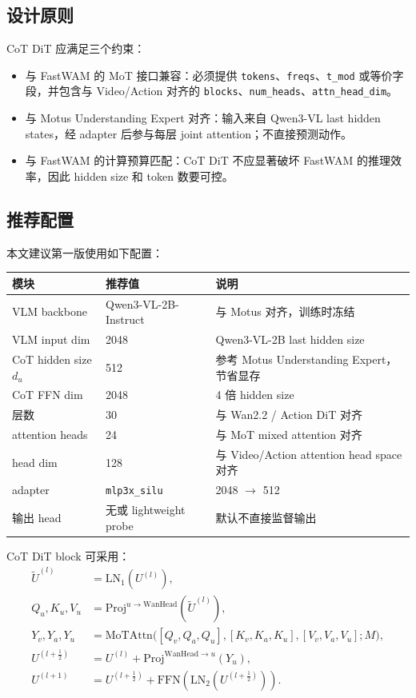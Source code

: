 \documentclass[UTF8,a4paper,11pt]{ctexart}
\begin{document}
\subsection{设计原则}

CoT DiT 应满足三个约束：
\begin{itemize}[leftmargin=1.6em]
  \item 与 FastWAM 的 MoT 接口兼容：必须提供 \texttt{tokens}、\texttt{freqs}、\texttt{t\_mod} 或等价字段，并包含与 Video/Action 对齐的 \texttt{blocks}、\texttt{num\_heads}、\texttt{attn\_head\_dim}。
  \item 与 Motus Understanding Expert 对齐：输入来自 Qwen3-VL last hidden states，经 adapter 后参与每层 joint attention；不直接预测动作。
  \item 与 FastWAM 的计算预算匹配：CoT DiT 不应显著破坏 FastWAM 的推理效率，因此 hidden size 和 token 数要可控。
\end{itemize}

\subsection{推荐配置}

本文建议第一版使用如下配置：

\begin{center}
\begin{tabular}{lll}
\toprule
模块 & 推荐值 & 说明 \\
\midrule
VLM backbone & Qwen3-VL-2B-Instruct & 与 Motus 对齐，训练时冻结 \\
VLM input dim & 2048 & Qwen3-VL-2B last hidden size \\
CoT hidden size $d_u$ & 512 & 参考 Motus Understanding Expert，节省显存 \\
CoT FFN dim & 2048 & 4 倍 hidden size \\
层数 & 30 & 与 Wan2.2 / Action DiT 对齐 \\
attention heads & 24 & 与 MoT mixed attention 对齐 \\
head dim & 128 & 与 Video/Action attention head space 对齐 \\
adapter & \texttt{mlp3x\_silu} & 2048 $\rightarrow$ 512 \\
输出 head & 无或 lightweight probe & 默认不直接监督输出 \\
\bottomrule
\end{tabular}
\end{center}

CoT DiT block 可采用：
\[
\begin{aligned}
\tilde{U}^{(l)} &= \mathrm{LN}_1(U^{(l)}),\\
Q_u,K_u,V_u &= \mathrm{Proj}^{u\rightarrow \mathrm{WanHead}}(\tilde{U}^{(l)}),\\
Y_v,Y_a,Y_u &= \mathrm{MoTAttn}\bigl([Q_v,Q_a,Q_u], [K_v,K_a,K_u], [V_v,V_a,V_u]; M\bigr),\\
U^{(l+\frac12)} &= U^{(l)} + \mathrm{Proj}^{\mathrm{WanHead}\rightarrow u}(Y_u),\\
U^{(l+1)} &= U^{(l+\frac12)} + \mathrm{FFN}(\mathrm{LN}_2(U^{(l+\frac12)})).
\end{aligned}
\]
\end{document}
